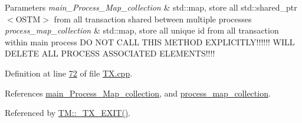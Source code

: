 \begin{DoxyParams}{Parameters}
{\em main\+\_\+\+Process\+\_\+\+Map\+\_\+collection} & std\+::map, store all std\+::shared\+\_\+ptr$<$\+O\+S\+T\+M$>$ from all transaction shared between multiple processes \\
\hline
{\em process\+\_\+map\+\_\+collection} & std\+::map, store all unique id from all transaction within main process DO N\+OT C\+A\+LL T\+H\+IS M\+E\+T\+H\+OD E\+X\+P\+L\+I\+C\+I\+T\+L\+Y!!!!!! W\+I\+LL D\+E\+L\+E\+TE A\+LL P\+R\+O\+C\+E\+SS A\+S\+S\+O\+C\+I\+A\+T\+ED E\+L\+E\+M\+E\+N\+T\+S!!!! \\
\hline
\end{DoxyParams}


Definition at line \hyperlink{_t_x_8cpp_source_l00072}{72} of file \hyperlink{_t_x_8cpp_source}{T\+X.\+cpp}.



References \hyperlink{_t_x_8h_source_l00108}{main\+\_\+\+Process\+\_\+\+Map\+\_\+collection}, and \hyperlink{_t_x_8h_source_l00113}{process\+\_\+map\+\_\+collection}.



Referenced by \hyperlink{_t_m_8cpp_source_l00101}{T\+M\+::\+\_\+\+T\+X\+\_\+\+E\+X\+I\+T()}.


